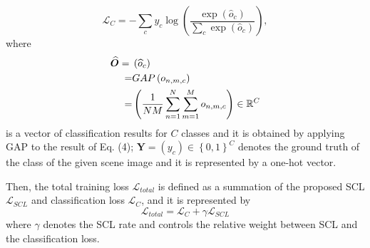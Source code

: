 \documentclass[journal,comsoc]{IEEEtran}
\begin{document}
\begin{equation}
{\mathcal{L}_C} =  - \sum\limits_c {{y_c}\log \left( {\frac{{\exp \left( {{{\widehat o}_c}} \right)}}{{\sum\limits_c {\exp \left( {{{\widehat o}_c}} \right)} }}} \right)}  ,
\label{eq5}
\end{equation}
where
\begin{equation}
\begin{aligned}
\widehat {\bm{O}} = {} & \left( {{{\widehat o}_c}} \right) \hfill \\
   = & GAP\left( {{o_{n,m,c}}} \right) \hfill \\
   = & \left( {\frac{1}{{NM}}\sum\limits_{n = 1}^N {\sum\limits_{m = 1}^M {{o_{n,m,c}}} } } \right) \in {\mathbb{R}^C} \hfill \\ 
\label{eq6}
\end{aligned}
\end{equation}
is a vector of classification results for $C$ classes and it is obtained by applying GAP to the result of Eq. (4); ${\bm{Y}} = \left( {{y_c}} \right) \in {\left\{ {0,1} \right\}^C}$ denotes the ground truth of the class of the given scene image and it is represented by a one-hot vector.

Then, the total training loss ${\mathcal{L}_{total}}$ is defined as a summation of the proposed SCL ${\mathcal{L}_{SCL}}$ and classification loss ${\mathcal{L}_{C}}$, and it is represented by
\begin{equation}
{\mathcal{L}_{total}} = {\mathcal{L}_C} + \gamma {\mathcal{L}_{SCL}}
\label{eq7}
\end{equation}
where $\gamma$ denotes the SCL rate and controls the relative weight between SCL and the classification loss.
\end{document}
